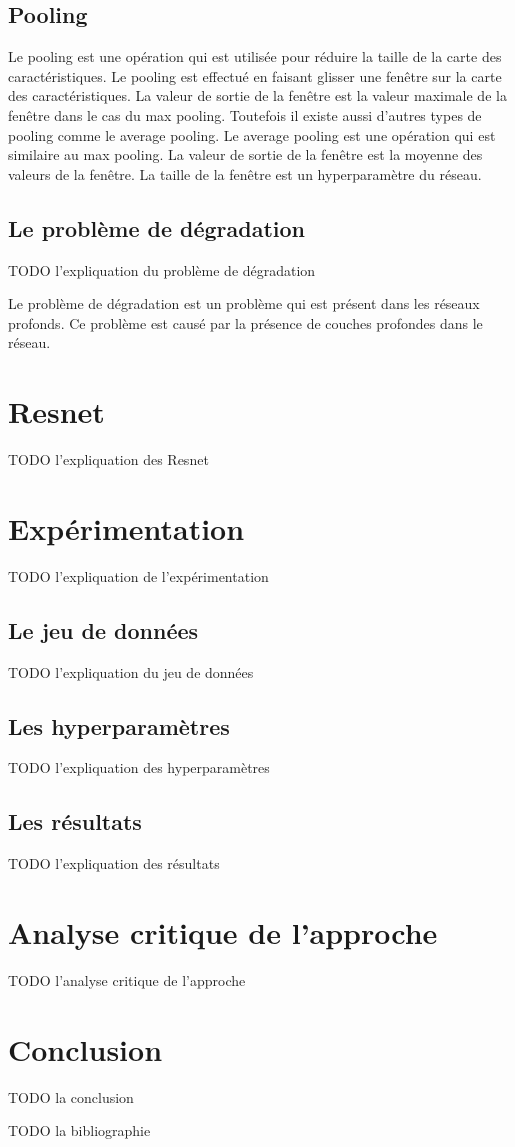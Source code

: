 \documentclass{article}
\begin{document}
\subsection{Pooling}
Le pooling est une opération qui est utilisée pour réduire la taille de la carte des caractéristiques.
Le pooling est effectué en faisant glisser une fenêtre sur la carte des caractéristiques.
La valeur de sortie de la fenêtre est la valeur maximale de la fenêtre dans le cas du max pooling.
Toutefois il existe aussi d'autres types de pooling comme le average pooling.
Le average pooling est une opération qui est similaire au max pooling.
La valeur de sortie de la fenêtre est la moyenne des valeurs de la fenêtre.
La taille de la fenêtre est un hyperparamètre du réseau.

\subsection{Le problème  de dégradation}

TODO l'expliquation du problème de dégradation

Le problème de dégradation est un problème qui est présent dans les réseaux profonds.
Ce problème est causé par la présence de couches profondes dans le réseau.




\section{Resnet}

TODO l'expliquation des Resnet

\section{Expérimentation}

TODO l'expliquation de l'expérimentation

\subsection{Le jeu de données}

TODO l'expliquation du jeu de données

\subsection{Les hyperparamètres}

TODO l'expliquation des hyperparamètres

\subsection{Les résultats}

TODO l'expliquation des résultats

\section{Analyse critique de l'approche}

TODO l'analyse critique de l'approche

\section{Conclusion}

TODO la conclusion





TODO la bibliographie
\end{document}
